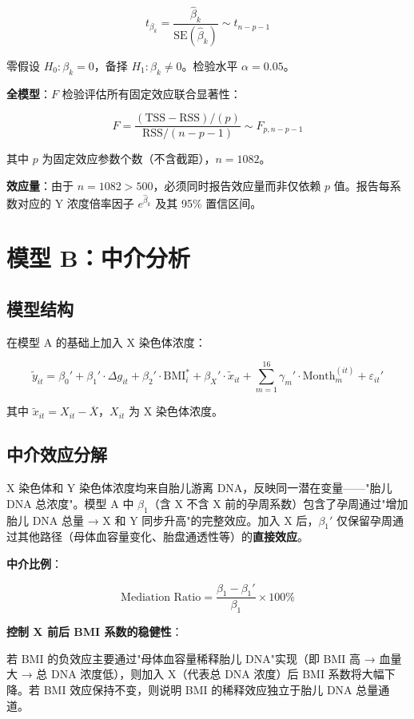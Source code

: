 \documentclass{internal-report}
\begin{document}
$$
t_{\beta_k} = \frac{\hat{\beta}_k}{\text{SE}(\hat{\beta}_k)} \sim t_{n-p-1}
$$

零假设 $H_0: \beta_k = 0$，备择 $H_1: \beta_k \neq 0$。检验水平 $\alpha = 0.05$。

\textbf{全模型}：$F$ 检验评估所有固定效应联合显著性：

$$
F = \frac{(\text{TSS} - \text{RSS})/(p)}{\text{RSS}/(n-p-1)} \sim F_{p, n-p-1}
$$

其中 $p$ 为固定效应参数个数（不含截距），$n=1082$。

\textbf{效应量}：由于 $n=1082 > 500$，必须同时报告效应量而非仅依赖 $p$ 值。报告每系数对应的 Y 浓度倍率因子 $e^{\hat{\beta}_k}$ 及其 95\% 置信区间。

\section{模型 B：中介分析}

\subsection{模型结构}

在模型 A 的基础上加入 X 染色体浓度：

$$
\tilde{y}_{it} = \beta_0' + \beta_1' \cdot \Delta g_{it} + \beta_2' \cdot \text{BMI}_i^* + \beta_X' \cdot \tilde{x}_{it} + \sum_{m=1}^{16} \gamma_m' \cdot \text{Month}_m^{(it)} + \varepsilon_{it}'
$$

其中 $\tilde{x}_{it} = X_{it} - \overline{X}$，$X_{it}$ 为 X 染色体浓度。

\subsection{中介效应分解}

X 染色体和 Y 染色体浓度均来自胎儿游离 DNA，反映同一潜在变量——"胎儿 DNA 总浓度"。模型 A 中 $\beta_1$（含 X 不含 X 前的孕周系数）包含了孕周通过"增加胎儿 DNA 总量 → X 和 Y 同步升高"的完整效应。加入 X 后，$\beta_1'$ 仅保留孕周通过其他路径（母体血容量变化、胎盘通透性等）的\textbf{直接效应}。

\textbf{中介比例}：

$$
\text{Mediation Ratio} = \frac{\beta_1 - \beta_1'}{\beta_1} \times 100\%
$$

\textbf{控制 X 前后 BMI 系数的稳健性}：

若 BMI 的负效应主要通过"母体血容量稀释胎儿 DNA"实现（即 BMI 高 → 血量大 → 总 DNA 浓度低），则加入 X（代表总 DNA 浓度）后 BMI 系数将大幅下降。若 BMI 效应保持不变，则说明 BMI 的稀释效应独立于胎儿 DNA 总量通道。
\end{document}
